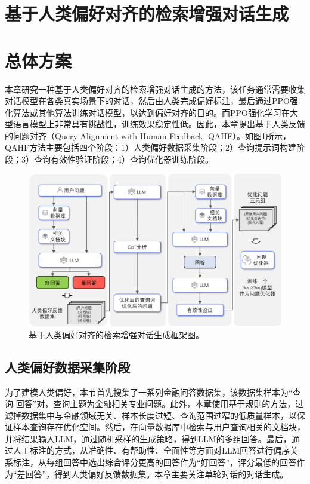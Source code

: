 \section{基于人类偏好对齐的检索增强对话生成}

\section{总体方案}

本章研究一种基于人类偏好对齐的检索增强对话生成的方法，该任务通常需要收集对话模型在各类真实场景下的对话，然后由人类完成偏好标注，最后通过PPO强化算法或其他算法训练对话模型，以达到偏好对齐的目的。而PPO强化学习在大型语言模型上非常具有挑战性，训练效果稳定性低。因此，本章提出基于人类反馈的问题对齐（Query Alignment with Human Feedback, QAHF）。如图\ref{qahf_framework}所示，QAHF方法主要包括四个阶段：1）人类偏好数据采集阶段；2）查询提示词构建阶段；3）查询有效性验证阶段；4）查询优化器训练阶段。

\begin{figure}[htbp]
	\centering
	\includegraphics[scale=0.55]{Fig/qahf_framework.png}
	\caption{\label{qahf_framework}基于人类偏好对齐的检索增强对话生成框架图。}
\end{figure}

\subsection{人类偏好数据采集阶段}

为了建模人类偏好，本节首先搜集了一系列金融问答数据集，该数据集样本为“查询-回答”对，查询主题为金融相关专业问题。此外，本章使用基于规则的方法，过滤掉数据集中与金融领域无关、样本长度过短、查询范围过窄的低质量样本，以保证样本查询存在优化空间。然后，在向量数据库中检索与用户查询相关的文档块，并将结果输入LLM，通过随机采样的生成策略，得到LLM的多组回答。最后，通过人工标注的方式，从准确性、有帮助性、全面性等方面对LLM回答进行偏序关系标注，从每组回答中选出综合评分更高的回答作为“好回答”，评分最低的回答作为“差回答”，得到人类偏好反馈数据集。本章主要关注单轮对话的对话生成。

